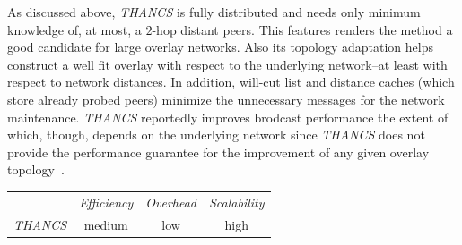 %
%
%

As discussed above, \emph{THANCS} is fully distributed and needs only minimum knowledge
of, at most, a $2$-hop distant peers. This features renders 
the method a good candidate for large overlay networks.
Also its topology adaptation helps construct a well fit overlay
with respect to the underlying network--at least with respect to network
distances. In addition, will-cut list and distance caches (which store already
probed peers) minimize the unnecessary messages for the network maintenance.
\emph{THANCS} reportedly improves brodcast performance the extent of which, though,
depends on the underlying network since \emph{THANCS} does not provide the
performance guarantee for the improvement of any given overlay topology~\cite{HLY2010}.

\begin{center}
{\footnotesize
\begin{tabular}{rccc}
\multicolumn{1}{r}{} &
\multicolumn{1}{c}{\emph{Efficiency}} &
\multicolumn{1}{c}{\emph{Overhead}} &
\multicolumn{1}{c}{\emph{Scalability}}
\\
\cline{2-4}
\emph{THANCS} &
% 
medium &
low &
high
\end{tabular}
}
\end{center}

